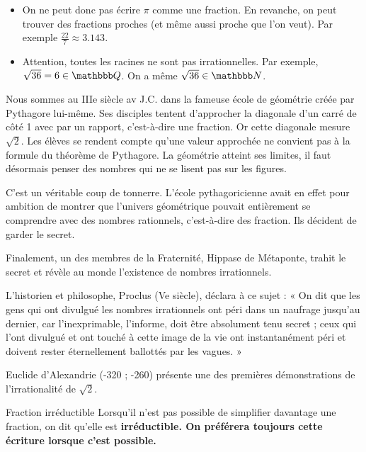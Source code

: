 \documentclass[10pt,a4paper,openany,twoside,prof]{book}
\begin{document}
\begin{rems}{}{}
	\begin{itemize}
		\item
		On ne peut donc pas écrire $\pi$ comme une fraction. En revanche, on peut trouver des fractions proches (et même aussi proche que l'on veut). Par exemple $\frac{22}{7} \approx 3.143$.
		\item Attention, toutes les racines ne sont pas irrationnelles. Par exemple, $\sqrt{36}=6\in\Q$. On a même $\sqrt{36}\in\N$.
	\end{itemize}
\end{rems}

\begin{histoire}{}{}
	Nous sommes au IIIe siècle av J.C. dans la fameuse école de géométrie créée par Pythagore lui-même. Ses disciples tentent d'approcher la diagonale d'un carré de côté 1 avec par un rapport, c'est-à-dire une fraction. Or cette diagonale mesure $\sqrt{2}$. Les élèves se rendent compte qu'une valeur approchée ne convient pas à la formule du théorème de Pythagore.
	La géométrie atteint ses limites, il faut désormais penser des nombres qui ne se lisent pas sur les figures.

	C'est un véritable coup de tonnerre. L'école pythagoricienne avait en effet pour ambition de montrer que l'univers géométrique pouvait entièrement se comprendre avec des nombres rationnels, c'est-à-dire des fraction. Ils décident de garder le secret.

	Finalement, un des membres de la Fraternité, Hippase de Métaponte, trahit le secret et révèle au monde l'existence de nombres irrationnels.

L'historien et philosophe, Proclus (Ve siècle), déclara à ce sujet :
« On dit que les gens qui ont divulgué les nombres irrationnels ont péri dans un naufrage jusqu'au dernier, car l'inexprimable, l'informe, doit être absolument tenu secret ; ceux qui l'ont divulgué et ont touché à cette image de la vie ont instantanément péri et doivent rester éternellement ballottés par les vagues. »


Euclide d'Alexandrie (-320 ; -260) présente une des premières démonstrations de l'irrationalité de $\sqrt{2}$.

\end{histoire}

\begin{defi}{Fraction irréductible}{}
	Lorsqu'il n'est pas possible de simplifier davantage une fraction, on dit qu'elle est \bf{irréductible}. On préférera toujours cette écriture lorsque c'est possible.
\end{defi}
\end{document}
